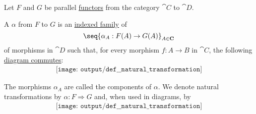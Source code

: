 \begin{definition}\label{def:natural_transformation}
  Let \( F \) and \( G \) be parallel \hyperref[def:functor]{functors} from the category \( \cat{C} \) to \( \cat{D} \).

  A  \( \alpha \) from \( F \) to \( G \) is an \hyperref[def:indexed_family]{indexed family} of
  \begin{equation}\label{eq:def:natural_transformation/family}
    \seq{ \alpha_A: F(A) \to G(A) }_{A \in \cat{C}}
  \end{equation}
  of morphisms in \( \cat{D} \) such that, for every morphism \( f: A \to B \) in \( \cat{C} \), the following \hyperref[def:categorical_diagram]{diagram commutes}:
  \begin{equation}\label{eq:def:natural_transformation/diagram}
    \begin{aligned}
      \texttt{[image: output/def\_\_natural\_transformation]}
    \end{aligned}
  \end{equation}

  The morphisms \( \alpha_A \) are called the components of \( \alpha \). We denote natural transformations by \( \alpha: F \Rightarrow G \) and, when used in diagrams, by
  \begin{equation}\label{eq:def:natural_transformation/notation}
    \begin{aligned}
      \texttt{[image: output/def\_\_natural\_transformation]}
    \end{aligned}
  \end{equation}
\end{definition}

